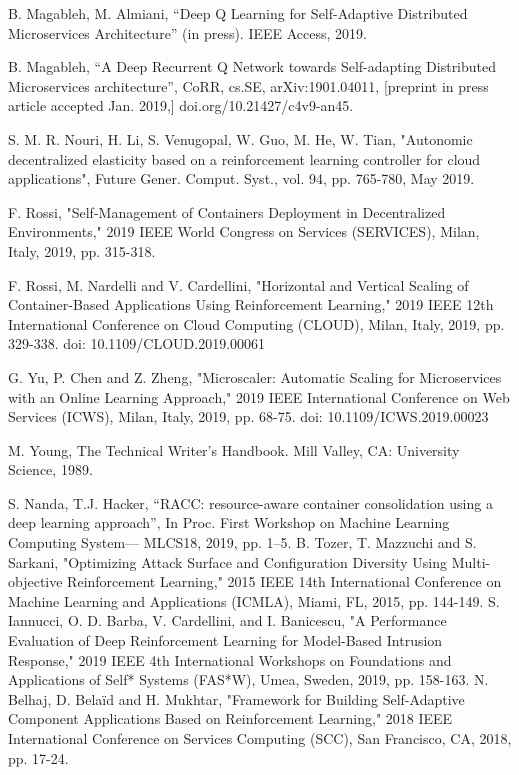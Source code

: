 \documentclass[conference]{IEEEtran}
\begin{document}
\begin{thebibliography}{00}
 B. Magableh, M. Almiani, “Deep Q Learning for Self-Adaptive Distributed Microservices Architecture” (in press). IEEE Access, 2019.

 B. Magableh, “A Deep Recurrent Q Network towards Self-adapting Distributed Microservices architecture”, CoRR, cs.SE, arXiv:1901.04011, [preprint in press article accepted Jan. 2019,] doi.org/10.21427/c4v9-an45.

 S. M. R. Nouri, H. Li, S. Venugopal, W. Guo, M. He, W. Tian, "Autonomic decentralized elasticity based on a reinforcement learning controller for cloud applications", Future Gener. Comput. Syst., vol. 94, pp. 765-780, May 2019.

 F. Rossi, "Self-Management of Containers Deployment in Decentralized Environments," 2019 IEEE World Congress on Services (SERVICES), Milan, Italy, 2019, pp. 315-318.

 F. Rossi, M. Nardelli and V. Cardellini, "Horizontal and Vertical Scaling of Container-Based Applications Using Reinforcement Learning," 2019 IEEE 12th International Conference on Cloud Computing (CLOUD), Milan, Italy, 2019, pp. 329-338. doi: 10.1109/CLOUD.2019.00061

 G. Yu, P. Chen and Z. Zheng, "Microscaler: Automatic Scaling for Microservices with an Online Learning Approach," 2019 IEEE International Conference on Web Services (ICWS), Milan, Italy, 2019, pp. 68-75.
doi: 10.1109/ICWS.2019.00023

 M. Young, The Technical Writer's Handbook. Mill Valley, CA: University Science, 1989.

 S. Nanda, T.J. Hacker, “RACC: resource-aware container consolidation using a deep learning approach”, In Proc. First Workshop on Machine Learning Computing System— MLCS18, 2019, pp. 1–5.
 B. Tozer, T. Mazzuchi and S. Sarkani, "Optimizing Attack Surface and Configuration Diversity Using Multi-objective Reinforcement Learning," 2015 IEEE 14th International Conference on Machine Learning and Applications (ICMLA), Miami, FL, 2015, pp. 144-149.
 S. Iannucci, O. D. Barba, V. Cardellini, and I. Banicescu, "A Performance Evaluation of Deep Reinforcement Learning for Model-Based Intrusion Response," 2019 IEEE 4th International Workshops on Foundations and Applications of Self* Systems (FAS*W), Umea, Sweden, 2019, pp. 158-163.
 N. Belhaj, D. Belaïd and H. Mukhtar, "Framework for Building Self-Adaptive Component Applications Based on Reinforcement Learning," 2018 IEEE International Conference on Services Computing (SCC), San Francisco, CA, 2018, pp. 17-24. 


\end{thebibliography}
\end{document}
